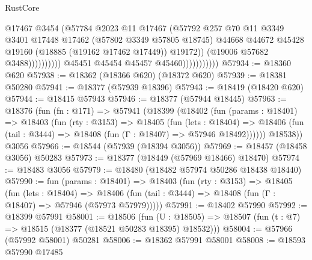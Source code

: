 \begin{lexlean}{RustCore}
\begin{coremodule}
                                            @17467
                                            @3454
                                            (@57784
                                              @2023
                                              @11
                                              @17467
                                              (@57792
                                                @257
                                                @70
                                                @11
                                                @3349
                                                @3401
                                                @17448
                                                @17462
                                                (@57802 @3349 @57805 @18745)
                                                @44668
                                                @44672
                                                @45428
                                                @19160
                                                (@18885 (@19162 @17462 @17449))
                                                @19172))
                                            (@19006 @57682 @3488))))))))))
                          @45451
                          @45454
                          @45457
                          @45460)))))))))))
@57934 := @18360 @620
@57938 := @18362 (@18366 @620) (@18372 @620)
@57939 := @18381 @50280
@57941 := @18377 (@57939 @18396)
@57943 := @18419 (@18420 @620)
@57944 := @18415 @57943
@57946 := @18377 (@57944 @18445)
@57963 := @18376
    (fun (fn : @171) =>
    @57941
      (@18399
        (@18402
          (fun (params : @18401) =>
          @18403
            (fun (rty : @3153) =>
            @18405
              (fun (lets : @18404) =>
              @18406 (fun (tail : @3444) => @18408 (fun (Γ : @18407) => @57946 @18492))))))
        @18538))
    @3056
@57966 := @18544 (@57939 (@18394 @3056))
@57969 := @18457 (@18458 @3056) @50283
@57973 := @18377 (@18449 (@57969 @18466) @18470)
@57974 := @18483 @3056
@57979 := @18480 (@18482 @57974 @50286 @18438 @18440)
@57990 := fun (params : @18401) =>
  @18403
    (fun (rty : @3153) =>
    @18405
      (fun (lets : @18404) =>
      @18406 (fun (tail : @3444) => @18408 (fun (Γ : @18407) => @57946 (@57973 @57979)))))
@57991 := @18402 @57990
@57992 := @18399 @57991
@58001 := @18506
    (fun (U : @18505) => @18507 (fun (t : @7) => @18515 (@18377 (@18521 @50283 @18395) @18532)))
@58004 := @57966 (@57992 @58001) @50281
@58006 := @18362 @57991 @58001
@58008 := @18593 @57990 @17485

\end{coremodule}
\end{lexlean}
